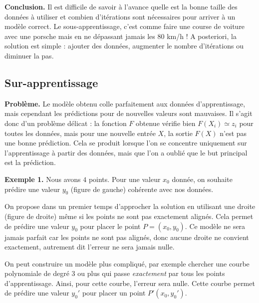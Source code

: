{\bigskip

\textbf{Conclusion.} 
Il est difficile de savoir à l'avance quelle est la bonne taille
des données à utiliser et combien d'itérations sont nécessaires pour arriver à un modèle correct. Le sous-apprentissage, c'est comme faire une course de voiture avec une porsche mais en ne dépassant jamais les 80 km/h !
A posteriori, la solution est simple : ajouter des données, augmenter le nombre d'itérations ou diminuer la pas.


\subsection{Sur-apprentissage}


\textbf{Problème.} Le modèle obtenu \og{}colle\fg{} parfaitement aux données d'apprentissage, mais cependant les prédictions pour de nouvelles valeurs sont mauvaises.
Il s'agit donc d'un problème délicat : la fonction $F$ obtenue vérifie bien $F(X_i) \simeq z_i$ pour toutes les données, mais pour une nouvelle entrée $X$, la sortie $F(X)$ n'est pas une bonne prédiction. Cela se produit lorsque l'on se concentre uniquement sur l'apprentissage à partir des données, mais que l'on a oublié que le but principal est la prédiction.

\bigskip


\textbf{Exemple 1.} Nous avons $4$ points.
Pour une valeur $x_0$ donnée, on souhaite prédire une valeur $y_0$ (figure de gauche) cohérente avec nos données.

On propose dans un premier temps d'approcher la solution en utilisant une droite (figure de droite) même si les points ne sont pas exactement alignés. Cela permet de prédire une valeur $y_0$ pour placer le point $P=(x_0,y_0)$.
Ce modèle ne sera jamais parfait car les points ne sont pas alignés, donc aucune droite ne convient exactement, autrement dit l'erreur ne sera jamais nulle.


On peut construire un modèle plus compliqué, par exemple chercher une courbe polynomiale de degré $3$ ou plus qui passe \emph{exactement} par tous les points d'apprentissage. Ainsi, pour cette courbe, l'erreur sera nulle. Cette courbe permet de prédire une valeur $y_0'$ pour placer un point $P'(x_0,y_0')$. 

}

